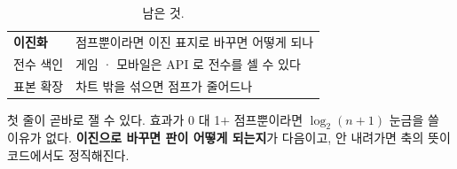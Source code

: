 \documentclass[10pt]{article}
\begin{document}

\begin{table}[t]
\centering\tsize
\caption{남은 것.}
\begin{tabular}{ll}
\toprule
\textbf{이진화} & 점프뿐이라면 이진 표지로 바꾸면 어떻게 되나 \\
전수 색인 & 게임 · 모바일은 API 로 전수를 셀 수 있다 \\
표본 확장 & 차트 밖을 섞으면 점프가 줄어드나 \\
\bottomrule
\end{tabular}
\end{table}

첫 줄이 곧바로 잴 수 있다. 효과가 0 대 1$+$ 점프뿐이라면 $\log_2(n{+}1)$
눈금을 쓸 이유가 없다. \textbf{이진으로 바꾸면 판이 어떻게 되는지}가
다음이고, 안 내려가면 축의 뜻이 코드에서도 정직해진다.
\end{document}

